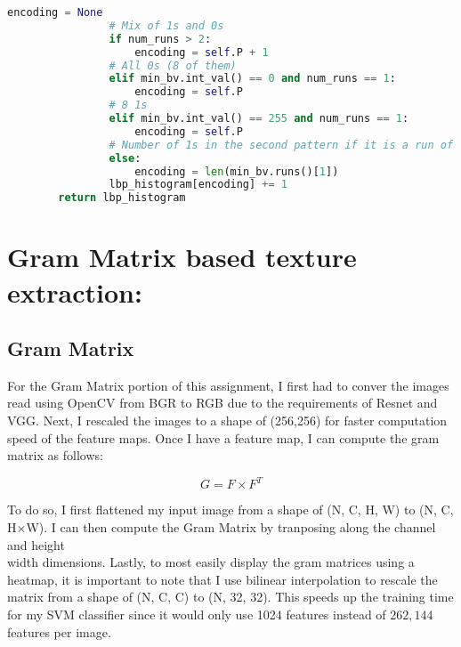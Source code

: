 \documentclass{article}
\begin{document}
\begin{lstlisting}[language=Python]
                encoding = None
                # Mix of 1s and 0s
                if num_runs > 2:
                    encoding = self.P + 1
                # All 0s (8 of them)
                elif min_bv.int_val() == 0 and num_runs == 1:
                    encoding = self.P
                # 8 1s
                elif min_bv.int_val() == 255 and num_runs == 1:
                    encoding = self.P
                # Number of 1s in the second pattern if it is a run of all 0s then 1s
                else:
                    encoding = len(min_bv.runs()[1])
                lbp_histogram[encoding] += 1
        return lbp_histogram
\end{lstlisting}



\section{Gram Matrix based texture extraction:} %
\subsection{Gram Matrix}
For the Gram Matrix portion of this assignment, I first had to conver the images read using OpenCV from BGR to RGB due to the requirements of Resnet and VGG. Next, I rescaled the images to a shape of (256,256) for faster computation speed of the feature maps. Once I have a feature map, I can compute the gram matrix as follows:

\[G = F \times F^T \]

To do so, I first flattened my input image from a shape of (N, C, H, W) to (N, C, H$\times$W). I can then compute the Gram Matrix by tranposing along the channel and height\\width dimensions. Lastly, to most easily display the gram matrices using a heatmap, it is important to note that I use bilinear interpolation to rescale the matrix from a shape of (N, C, C) to (N, 32, 32). This speeds up the training time for my SVM classifier since it would only use 1024 features instead of $262,144$ features per image.
\end{document}
